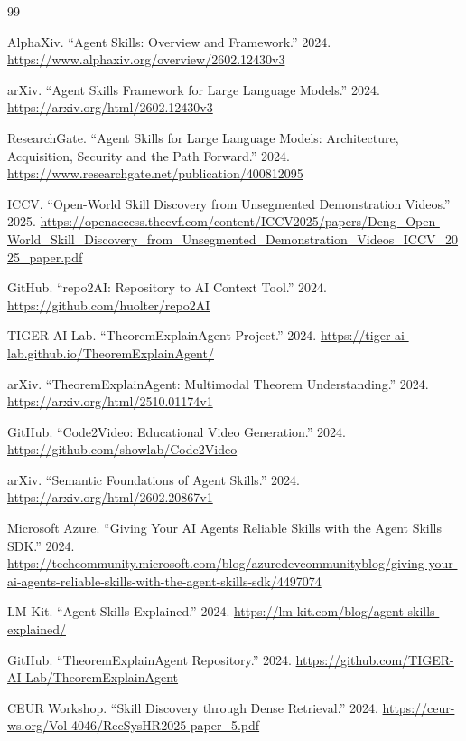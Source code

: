 \documentclass[11pt,a4paper]{article}
\begin{document}
\begin{thebibliography}{99}

AlphaXiv. ``Agent Skills: Overview and Framework.'' 2024. \url{https://www.alphaxiv.org/overview/2602.12430v3}

arXiv. ``Agent Skills Framework for Large Language Models.'' 2024. \url{https://arxiv.org/html/2602.12430v3}

ResearchGate. ``Agent Skills for Large Language Models: Architecture, Acquisition, Security and the Path Forward.'' 2024. \url{https://www.researchgate.net/publication/400812095}

ICCV. ``Open-World Skill Discovery from Unsegmented Demonstration Videos.'' 2025. \url{https://openaccess.thecvf.com/content/ICCV2025/papers/Deng_Open-World_Skill_Discovery_from_Unsegmented_Demonstration_Videos_ICCV_2025_paper.pdf}

GitHub. ``repo2AI: Repository to AI Context Tool.'' 2024. \url{https://github.com/huolter/repo2AI}

TIGER AI Lab. ``TheoremExplainAgent Project.'' 2024. \url{https://tiger-ai-lab.github.io/TheoremExplainAgent/}

arXiv. ``TheoremExplainAgent: Multimodal Theorem Understanding.'' 2024. \url{https://arxiv.org/html/2510.01174v1}

GitHub. ``Code2Video: Educational Video Generation.'' 2024. \url{https://github.com/showlab/Code2Video}

arXiv. ``Semantic Foundations of Agent Skills.'' 2024. \url{https://arxiv.org/html/2602.20867v1}

Microsoft Azure. ``Giving Your AI Agents Reliable Skills with the Agent Skills SDK.'' 2024. \url{https://techcommunity.microsoft.com/blog/azuredevcommunityblog/giving-your-ai-agents-reliable-skills-with-the-agent-skills-sdk/4497074}

LM-Kit. ``Agent Skills Explained.'' 2024. \url{https://lm-kit.com/blog/agent-skills-explained/}

GitHub. ``TheoremExplainAgent Repository.'' 2024. \url{https://github.com/TIGER-AI-Lab/TheoremExplainAgent}

CEUR Workshop. ``Skill Discovery through Dense Retrieval.'' 2024. \url{https://ceur-ws.org/Vol-4046/RecSysHR2025-paper_5.pdf}


\end{thebibliography}
\end{document}
